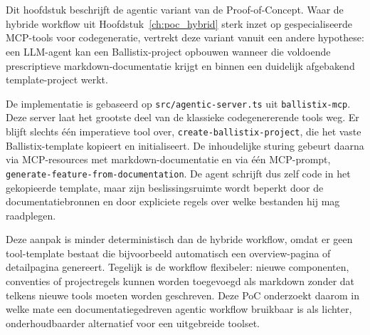 
\chapter{}%
\label{ch:poc_agentic}

\section{}
\label{sec:poc-agentic-inleiding}

Dit hoofdstuk beschrijft de agentic variant van de Proof-of-Concept. Waar de hybride workflow uit Hoofdstuk~\ref{ch:poc_hybrid} sterk inzet op gespecialiseerde MCP-tools voor codegeneratie, vertrekt deze variant vanuit een andere hypothese: een LLM-agent kan een Ballistix-project opbouwen wanneer die voldoende prescriptieve markdown-documentatie krijgt en binnen een duidelijk afgebakend template-project werkt.

De implementatie is gebaseerd op \texttt{src/agentic-server.ts} uit \texttt{ballistix-mcp}. Deze server laat het grootste deel van de klassieke codegenererende tools weg. Er blijft slechts één imperatieve tool over, \texttt{create-ballistix-project}, die het vaste Ballistix-template kopieert en initialiseert. De inhoudelijke sturing gebeurt daarna via MCP-resources met markdown-documentatie en via één MCP-prompt, \texttt{generate-feature-from-documentation}. De agent schrijft dus zelf code in het gekopieerde template, maar zijn beslissingsruimte wordt beperkt door de documentatiebronnen en door expliciete regels over welke bestanden hij mag raadplegen.

Deze aanpak is minder deterministisch dan de hybride workflow, omdat er geen tool-template bestaat die bijvoorbeeld automatisch een overview-pagina of detailpagina genereert. Tegelijk is de workflow flexibeler: nieuwe componenten, conventies of projectregels kunnen worden toegevoegd als markdown zonder dat telkens nieuwe tools moeten worden geschreven. Deze PoC onderzoekt daarom in welke mate een documentatiegedreven agentic workflow bruikbaar is als lichter, onderhoudbaarder alternatief voor een uitgebreide toolset.

